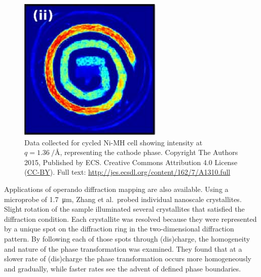\documentclass[journal=cmatex,manuscript=perspective]{achemso}
\begin{document}
\begin{figure}
  \includegraphics[width=\textwidth]{jensen2015.png}
  \caption{Data collected for cycled Ni-MH cell showing intensity at
    $q = \SI{1.36}{\per\angstrom}$, representing the cathode
    phase.\cite{jensen2015} Copyright The Authors 2015, Published by
    ECS. Creative Commons Attribution 4.0 License
    (\href{http://creativecommons.org/licenses/by/4.0/}{CC-BY}). Full
    text: \url{http://jes.ecsdl.org/content/162/7/A1310.full}}
  \label{figure:jensen2015}
\end{figure}

Applications of operando diffraction mapping are also available. Using
a microprobe of \SI{1.7}{\micro\meter}, Zhang et al.\ probed
individual nanoscale 
crystallites\cite{zhang2015-2}. Slight rotation of the sample
illuminated several crystallites that satisfied the diffraction
condition. Each crystallite was resolved because they were represented
by a unique spot on the diffraction ring in the two-dimensional
diffraction pattern. By following each of those spots through
(dis)charge, the homogeneity and nature of the phase transformation
was examined. They found that at a slower rate of (dis)charge the
phase transformation occurs more homogeneously and gradually, while
faster rates see the advent of defined phase
boundaries\cite{zhang2015-2}.
\end{document}
